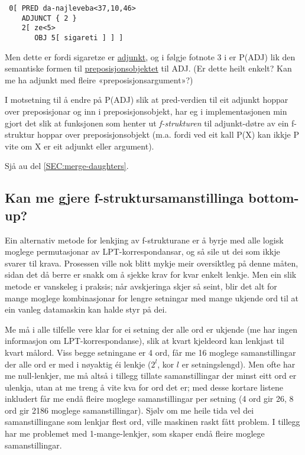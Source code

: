 \documentclass[11pt,a4paper,oneside,draft]{book}
\begin{document}
\begin{verbatim}
 0[ PRED da-najleveba<37,10,46>
    ADJUNCT { 2 }
    2[ ze<5>
       OBJ 5[ sigareti ] ] ]
\end{verbatim}


Men dette er fordi sigaretze er \underline{adjunkt}, og i følgje fotnote 3 i
\citet{dyvik2009lmp} er P(ADJ) lik den semantiske formen til
\underline{preposisjonsobjektet} til ADJ. (Er dette heilt enkelt? Kan me ha
adjunkt med fleire «preposisjonsargument»?)

I motsetning til å endre på P(ADJ) slik at pred-verdien til eit
adjunkt hoppar over preposisjonar og inn i preposisjonsobjekt, har eg
i implementasjonen min gjort det slik at funksjonen som henter ut \emph{f-strukturen} til adjunkt-døtre av ein f-struktur hoppar over
preposisjonsobjekt (m.a. fordi ved eit kall P(X) kan ikkje P vite om X
er eit adjunkt eller argument).

Sjå au del \ref{SEC:merge-daughters}.

\subsection{Kan me gjere f-struktursamanstillinga bottom-up?}
\label{sec-4.1.4}

Ein alternativ metode for lenkjing av f-strukturane er å byrje med
alle logisk moglege permutasjonar av LPT-korrespondansar, og så sile
ut dei som ikkje svarer til krava. Prosessen ville nok blitt mykje
meir oversiktleg på denne måten, sidan det då berre er snakk om å
sjekke krav for kvar enkelt lenkje.  Men ein slik metode er vanskeleg
i praksis; når avskjeringa skjer så seint, blir det alt for mange
moglege kombinasjonar for lengre setningar med mange ukjende ord til
at ein vanleg datamaskin kan halde styr på dei.

Me må i alle tilfelle vere klar for ei setning der alle ord er ukjende
(me har ingen informasjon om LPT-korrespondanse), slik at kvart
kjeldeord kan lenkjast til kvart målord. Viss begge setningane er 4 ord,
får me 16 moglege samanstillingar der alle ord er med i nøyaktig éi
lenkje ($2^l$, kor $l$ er setningslengd). Men ofte har me
null-lenkjer, me må altså i tillegg tillate samanstillingar der minst
eitt ord er ulenkja, utan at me treng å vite kva for ord det er; med
desse kortare listene inkludert får me endå fleire moglege
samanstillingar per setning (4 ord gir 26, 8 ord gir 2186 moglege
samanstillingar). Sjølv om me heile tida vel dei samanstillingane som
lenkjar flest ord, ville maskinen raskt fått problem. I tillegg har me
problemet med 1-mange-lenkjer, som skaper endå fleire moglege
samanstillingar.
\end{document}
